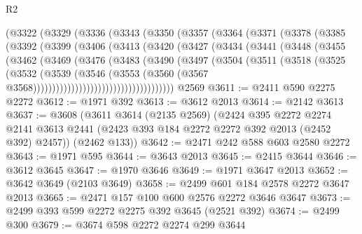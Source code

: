 \begin{lexlean}{R2}
\begin{coremodule}
      (@3322
        (@3329
          (@3336
            (@3343
              (@3350
                (@3357
                  (@3364
                    (@3371
                      (@3378
                        (@3385
                          (@3392
                            (@3399
                              (@3406
                                (@3413
                                  (@3420
                                    (@3427
                                      (@3434
                                        (@3441
                                          (@3448
                                            (@3455
                                              (@3462
                                                (@3469
                                                  (@3476
                                                    (@3483
                                                      (@3490
                                                        (@3497
                                                          (@3504
                                                            (@3511
                                                              (@3518
                                                                (@3525
                                                                  (@3532
                                                                    (@3539
                                                                      (@3546
                                                                        (@3553
                                                                          (@3560
                                                                            (@3567
                                                                              @3568)))))))))))))))))))))))))))))))))))))
    @2569
@3611 := @2411 @590 @2275 @2272
@3612 := @1971 @392
@3613 := @3612 @2013
@3614 := @2142 @3613
@3637 := @3608
    (@3611
      @3614
      (@2135 @2569)
      (@2424
        @395
        @2272
        @2274
        @2141
        @3613
        @2441
        (@2423 @393 @184 @2272 @2272 @392 @2013 (@2452 @392) @2457))
      (@2462 @133))
@3642 := @2471 @242 @588 @603 @2580 @2272
@3643 := @1971 @595
@3644 := @3643 @2013
@3645 := @2415 @3644
@3646 := @3612 @3645
@3647 := @1970 @3646
@3649 := @1971 @3647 @2013
@3652 := @3642 @3649 (@2103 @3649)
@3658 := @2499 @601 @184 @2578 @2272 @3647 @2013
@3665 := @2471 @157 @100 @600 @2576 @2272 @3646 @3647
@3673 := @2499 @393 @599 @2272 @2275 @392 @3645 (@2521 @392)
@3674 := @2499 @300
@3679 := @3674 @598 @2272 @2274 @299 @3644

\end{coremodule}
\end{lexlean}

